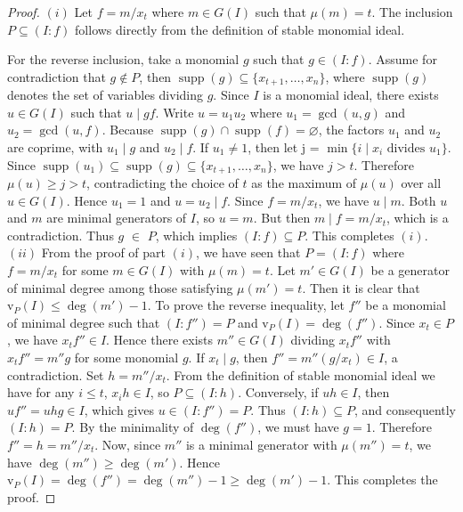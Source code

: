 \documentclass[11pt,reqno,a4paper]{amsart}
\let\emptyset\varnothing
\theoremstyle{definition}
\begin{document}
\begin{proof}
$(i)$ Let $ f = m/x_t $ where $m\in G(I)$ such that $\mu(m)=t$. 
The inclusion \( P \subseteq (I : f) \) follows directly from the definition of stable monomial ideal.  

For the reverse inclusion, take a monomial \( g \) such that \( g \in (I : f) \).  
Assume for contradiction that \( g \notin P \), then \( \operatorname{supp}(g) \subseteq \{x_{t+1},\dots,x_n\} \), where \(\operatorname{supp}(g)\) denotes the set of variables dividing \(g\). 
Since \( I \) is a monomial ideal, there exists \( u \in G(I) \) such that \( u \mid gf \).  
Write \( u = u_1u_2 \) where \( u_1 = \gcd(u,g) \) and \( u_2 = \gcd(u,f) \).  
Because \( \operatorname{supp}(g) \cap \operatorname{supp}(f) = \emptyset \), the factors \( u_1 \) and \( u_2 \) are coprime, with \( u_1 \mid g \) and \( u_2 \mid f \).
If \( u_1 \neq 1 \), then let j = $\min\{ i \mid x_i \text{ divides } u_1 \}$.  
Since \( \operatorname{supp}(u_1) \subseteq \operatorname{supp}(g) \subseteq \{x_{t+1},\dots,x_n\} \), we have \( j > t \).  
Therefore \( \mu(u) \ge j > t \), contradicting the choice of \( t \) as the maximum of \( \mu(u) \) over all \( u \in G(I) \).
Hence \( u_1 = 1 \) and \( u = u_2 \mid f \).  
Since \( f = m/x_t \), we have \( u \mid m \).  
Both \( u \) and \( m \) are minimal generators of \( I \), so \( u = m \).  
But then \( m \mid f = m/x_t \), which is a contradiction.
Thus \( g \) $\in$ \( P \), which implies \( (I:f) \subseteq P \). This completes $(i)$.  \\
$(ii)$ From the proof of part $(i)$, we have seen that \(P = (I:f)\) where \(f = m/x_t\) for some \(m \in G(I)\) with \(\mu(m)=t\). Let \(m' \in G(I)\) be a generator of minimal degree among those satisfying \(\mu(m')=t\). Then it is clear that \(\mathrm{v}_P(I) \le \deg(m') - 1\). To prove the reverse inequality, let \(f''\) be a monomial of minimal degree such that \((I:f'') = P\) and \(\mathrm{v}_P(I) = \deg(f'')\). Since \(x_t \in P\), we have \(x_t f'' \in I\). Hence there exists \(m'' \in G(I)\) dividing \(x_t f''\) with \(x_t f'' = m'' g\) for some monomial \(g\). If $x_t\mid g$, then $f''=m''(g/x_t)\in I$, a contradiction. Set \(h = m''/x_t\). From the definition of stable monomial ideal we have for  any \(i \le t\), \(x_i h \in I\), so \(P \subseteq (I:h)\). Conversely, if \(u h \in I\), then \(u f'' = u h g \in I\), which gives \(u \in (I:f'') = P\). Thus \((I:h) \subseteq P\), and consequently \((I:h) = P\). By the minimality of \(\deg(f'')\), we must have \(g = 1\). Therefore \(f'' = h = m''/x_t\). Now, since \(m''\) is a minimal generator with \(\mu(m'') = t\), we have \(\deg(m'') \ge \deg(m')\). Hence
\(
\mathrm{v}_P(I) = \deg(f'') = \deg(m'') - 1 \ge \deg(m') - 1.
\)
This completes the proof.
\end{proof}
\end{document}
